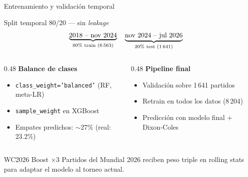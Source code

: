 \documentclass[aspectratio=169,10pt]{beamer}
\newcommand{\code}[1]{\texttt{#1}}
\begin{document}
\begin{frame}{Entrenamiento y validación temporal}

  \begin{exampleblock}{Split temporal 80/20 --- sin \emph{leakage}}
    \[
    \underbrace{\text{2018 -- nov 2024}}_{\text{80\% train (6\,563)}} \quad
    \underbrace{\text{nov 2024 -- jul 2026}}_{\text{20\% test (1\,641)}}
    \]
  \end{exampleblock}

  \vspace{0.08cm}
  \begin{columns}[T]
    \begin{column}{0.48\textwidth}
      \textbf{Balance de clases}
      \begin{itemize}\small
        \item \code{class\_weight='balanced'} (RF, meta-LR)
        \item \code{sample\_weight} en XGBoost
        \item Empates predichos: $\sim$27\% (real: 23.2\%)
      \end{itemize}
    \end{column}
    \begin{column}{0.48\textwidth}
      \textbf{Pipeline final}
      \begin{itemize}\small
        \item Validación sobre 1\,641 partidos
        \item Retrain en \alert{todos} los datos (8\,204)
        \item Predicción con modelo final + Dixon-Coles
      \end{itemize}
    \end{column}
  \end{columns}

  \vspace{0.3cm}
  \begin{block}{WC2026 Boost $\times$3}
    Partidos del Mundial 2026 reciben peso triple en rolling stats
    para adaptar el modelo al torneo actual.
  \end{block}
\end{frame}
\end{document}
